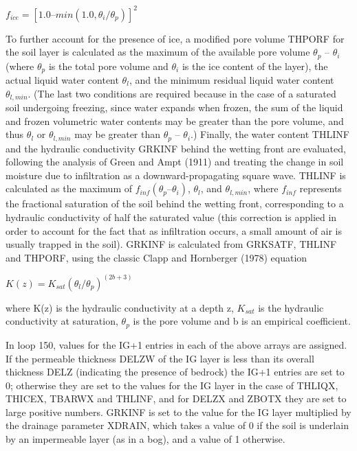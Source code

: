 $f_{ice} = [1.0 – min(1.0, \theta_i / \theta_p )]^2$

To further account for the presence of ice, a modified pore volume T\+H\+P\+O\+R\+F for the soil layer is calculated as the maximum of the available pore volume $\theta_p$ – $\theta_i$ (where $\theta_p$ is the total pore volume and $\theta_i$ is the ice content of the layer), the actual liquid water content $\theta_l$, and the minimum residual liquid water content $\theta_{l,min}$. (The last two conditions are required because in the case of a saturated soil undergoing freezing, since water expands when frozen, the sum of the liquid and frozen volumetric water contents may be greater than the pore volume, and thus $\theta_l$ or $\theta_{l,min}$ may be greater than $\theta_p$ – $\theta_i$.) Finally, the water content T\+H\+L\+I\+N\+F and the hydraulic conductivity G\+R\+K\+I\+N\+F behind the wetting front are evaluated, following the analysis of Green and Ampt (1911) \cite{Green1911-gy} and treating the change in soil moisture due to infiltration as a downward-\/propagating square wave. T\+H\+L\+I\+N\+F is calculated as the maximum of $f_{inf} ( \theta_p – \theta_i)$, $\theta_l$, and $\theta_{l,min}$, where $f_{inf}$ represents the fractional saturation of the soil behind the wetting front, corresponding to a hydraulic conductivity of half the saturated value (this correction is applied in order to account for the fact that as infiltration occurs, a small amount of air is usually trapped in the soil). G\+R\+K\+I\+N\+F is calculated from G\+R\+K\+S\+A\+T\+F, T\+H\+L\+I\+N\+F and T\+H\+P\+O\+R\+F, using the classic Clapp and Hornberger (1978) \cite{Clapp1978-898} equation

$K(z) = K_{sat} ( \theta_l / \theta_p)^{(2b + 3)}$

where K(z) is the hydraulic conductivity at a depth z, $K_{sat}$ is the hydraulic conductivity at saturation, $\theta_p$ is the pore volume and b is an empirical coefficient.

In loop 150, values for the I\+G+1 entries in each of the above arrays are assigned. If the permeable thickness D\+E\+L\+Z\+W of the I\+G layer is less than its overall thickness D\+E\+L\+Z (indicating the presence of bedrock) the I\+G+1 entries are set to 0; otherwise they are set to the values for the I\+G layer in the case of T\+H\+L\+I\+Q\+X, T\+H\+I\+C\+E\+X, T\+B\+A\+R\+W\+X and T\+H\+L\+I\+N\+F, and for D\+E\+L\+Z\+X and Z\+B\+O\+T\+X they are set to large positive numbers. G\+R\+K\+I\+N\+F is set to the value for the I\+G layer multiplied by the drainage parameter X\+D\+R\+A\+I\+N, which takes a value of 0 if the soil is underlain by an impermeable layer (as in a bog), and a value of 1 otherwise.

